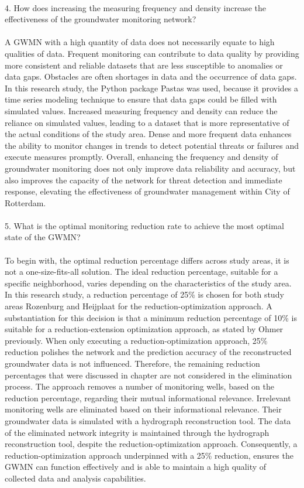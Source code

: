 \\
4. How does increasing the measuring frequency and density increase the effectiveness of the groundwater monitoring network? \\
\\
A GWMN with a high quantity of data does not necessarily equate to high qualities of data. Frequent monitoring can contribute to data quality by providing more consistent and reliable datasets that are less susceptible to anomalies or data gaps. Obstacles are often shortages in data and the occurrence of data gaps. In this research study, the Python package Pastas was used, because it provides a time series modeling technique to ensure that data gaps could be filled with simulated values. Increased measuring frequency and density can reduce the reliance on simulated values, leading to a dataset that is more representative of the actual conditions of the study area. Dense and more frequent data enhances the ability to monitor changes in trends to detect potential threats or failures and execute measures promptly. Overall, enhancing the frequency and density of groundwater monitoring does not only improve data reliability and accuracy, but also improves the capacity of the network for threat detection and immediate response, elevating the effectiveness of groundwater management within City of Rotterdam. \\
\newpage
\\
5. What is the optimal monitoring reduction rate to achieve the most optimal state of the GWMN? \\
\\
\noindent
To begin with, the optimal reduction percentage differs across study areas, it is not a one-size-fits-all solution. The ideal reduction percentage, suitable for a specific neighborhood, varies depending on the characteristics of the study area. In this research study, a reduction percentage of 25\% is chosen for both study areas Rozenburg and Heijplaat for the reduction-optimization approach. A substantiation for this decision is that a minimum reduction percentage of 10\% is suitable for a reduction-extension optimization approach, as stated by Ohmer \cite{ohmer-2019} previously. When only executing a reduction-optimization approach, 25\% reduction polishes the network and the prediction accuracy of the reconstructed groundwater data is not influenced. Therefore, the remaining reduction percentages that were discussed in chapter  are not considered in the elimination process. The approach removes a number of monitoring wells, based on the reduction percentage, regarding their mutual informational relevance. Irrelevant monitoring wells are eliminated based on their informational relevance. Their groundwater data is simulated with a hydrograph reconstruction tool. The data of the eliminated network integrity is maintained through the hydrograph reconstruction tool, despite the reduction-optimization approach. Consequently, a reduction-optimization approach underpinned with a 25\% reduction, ensures the GWMN can function effectively and is able to maintain a high quality of collected data and analysis capabilities. \\
